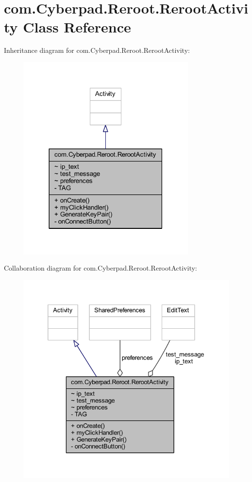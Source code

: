 \hypertarget{classcom_1_1_cyberpad_1_1_reroot_1_1_reroot_activity}{
\section{com.\-Cyberpad.\-Reroot.\-Reroot\-Activity \-Class \-Reference}
\label{classcom_1_1_cyberpad_1_1_reroot_1_1_reroot_activity}
}


\-Inheritance diagram for com.\-Cyberpad.\-Reroot.\-Reroot\-Activity\-:\nopagebreak
\begin{figure}[H]
\begin{center}
\leavevmode
\includegraphics[width=254pt]{classcom_1_1_cyberpad_1_1_reroot_1_1_reroot_activity__inherit__graph}
\end{center}
\end{figure}


\-Collaboration diagram for com.\-Cyberpad.\-Reroot.\-Reroot\-Activity\-:\nopagebreak
\begin{figure}[H]
\begin{center}
\leavevmode
\includegraphics[width=332pt]{classcom_1_1_cyberpad_1_1_reroot_1_1_reroot_activity__coll__graph}
\end{center}
\end{figure}
